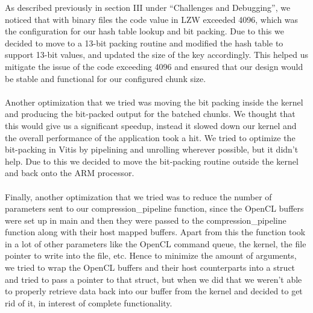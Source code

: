 \documentclass[../main.tex]{subfiles}
\begin{document}
As described previously in section III under “Challenges and Debugging”, we noticed that with binary files the code value in LZW exceeded 4096, which was the configuration for our hash table lookup and bit packing. Due to this we decided to move to a 13-bit packing routine and modified the hash table to support 13-bit values, and updated the size of the key accordingly. This helped us mitigate the issue of the code exceeding 4096 and ensured that our design would be stable and functional for our configured chunk size.\\ \\
Another optimization that we tried was moving the bit packing inside the kernel and producing the bit-packed output for the batched chunks. We thought that this would give us a significant speedup, instead it slowed down our kernel and the overall performance of the application took a hit. We tried to optimize the bit-packing in Vitis by pipelining and unrolling wherever possible, but it didn’t help. Due to this we decided to move the bit-packing routine outside the kernel and back onto the ARM processor.\\ \\
Finally, another optimization that we tried was to reduce the number of parameters sent to our compression\_pipeline function, since the OpenCL buffers were set up in main and then they were passed to the compression\_pipeline function along with their host mapped buffers. Apart from this the function took in a lot of other parameters like the OpenCL command queue, the kernel, the file pointer to write into the file, etc. Hence to minimize the amount of arguments, we tried to wrap the OpenCL buffers and their host counterparts into a struct and tried to pass a pointer to that struct, but when we did that we weren’t able to properly retrieve data back into our buffer from the kernel and decided to get rid of it, in interest of complete functionality.
\end{document}
